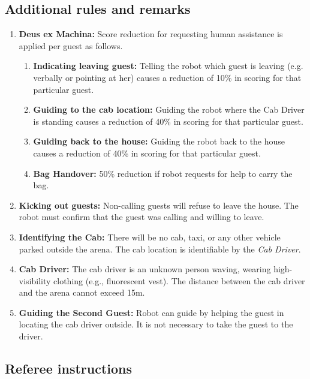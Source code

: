 \subsection{Additional rules and remarks}
\begin{enumerate}[nosep]
	\item \textbf{Deus ex Machina:} Score reduction for requesting human assistance is applied per guest as follows.
	\begin{enumerate}[nosep]
		\item \textbf{Indicating leaving guest:} Telling the robot which guest is leaving (e.g. verbally or pointing at her) causes a reduction of 10\% in scoring for that particular guest.

		\item \textbf{Guiding to the cab location:} Guiding the robot where the Cab Driver is standing causes a reduction of 40\% in scoring for that particular guest.

		\item \textbf{Guiding back to the house:} Guiding the robot back to the house causes a reduction of 40\% in scoring for that particular guest.

		\item \textbf{Bag Handover:} 50\% reduction if robot requests for help to carry the bag.
	\end{enumerate}

	\item \textbf{Kicking out guests:} Non-calling guests will refuse to leave the house. The robot must confirm that the guest was calling and willing to leave.
	
	\item \textbf{Identifying the Cab:} There will be no cab, taxi, or any other vehicle parked outside the arena.
	The cab location is identifiable by the \emph{Cab Driver}.

	\item \textbf{Cab Driver:} The cab driver is an unknown person waving, wearing high-visibility clothing (e.g., fluorescent vest).
	The distance between the cab driver and the arena cannot exceed 15m.
	
	\item  \textbf{Guiding the Second Guest:} Robot can guide by helping the guest in locating the cab driver outside. It is not necessary to take the guest to the driver.
	
\end{enumerate}


\subsection{Referee instructions}

